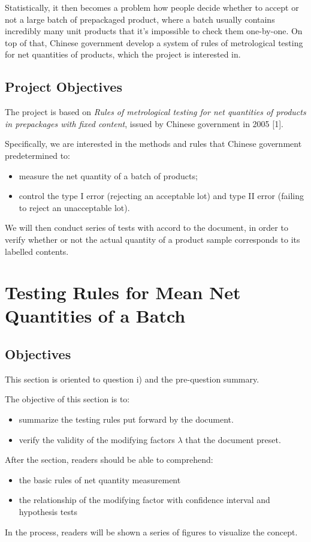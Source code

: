 \documentclass[a4paper]{article}
\begin{document}
Statistically, it then becomes a problem how people decide whether to accept or not a large batch of prepackaged product, where a batch usually contains incredibly many unit products that it's impossible to check them one-by-one. On top of that, Chinese government develop a system of rules of metrological testing for net quantities of products, which the project is interested in.
\subsection{Project Objectives}
The project is based on \textit{Rules of metrological testing for net quantities of products in prepackages with fixed content}, issued by Chinese government in 2005 [1].

Specifically, we are interested in the methods and rules that Chinese government predetermined to:
\begin{itemize}
\item measure the net quantity of a batch of products;
\item control the type I error (rejecting an acceptable lot) and type II error (failing to reject an unacceptable lot).
\end{itemize}

We will then conduct series of tests with accord to the document, in order to verify whether or not the actual quantity of a product sample corresponds to its labelled contents. 

\section{Testing Rules for Mean Net Quantities of a Batch}
\subsection{Objectives}
This section is oriented to question i) and the pre-question summary. 

The objective of this section is to:
\begin{itemize}
\item summarize the testing rules put forward by the document.
\item verify the validity of the modifying factors $\lambda$ that the document preset.
\end{itemize} 

After the section, readers should be able to comprehend:
\begin{itemize}
\item the basic rules of net quantity measurement
\item the relationship of the modifying factor with confidence interval and hypothesis tests
\end{itemize} 
In the process, readers will be shown a series of figures to visualize the concept.
\end{document}
